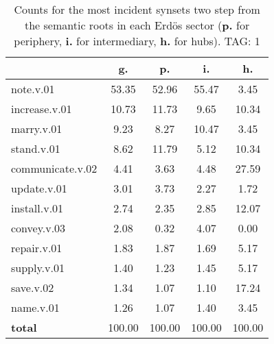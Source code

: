 \begin{table}[h!]
\begin{center}
\begin{tabular}{| l || c | c | c | c |}\hline
 & {\bf g.} & {\bf p.} & {\bf i.} & {\bf h.} \\\hline\hline
note.v.01 & 53.35  & 52.96  & 55.47  & 3.45 \\\hline
increase.v.01 & 10.73  & 11.73  & 9.65  & 10.34 \\\hline
marry.v.01 & 9.23  & 8.27  & 10.47  & 3.45 \\\hline
stand.v.01 & 8.62  & 11.79  & 5.12  & 10.34 \\\hline
communicate.v.02 & 4.41  & 3.63  & 4.48  & 27.59 \\\hline
update.v.01 & 3.01  & 3.73  & 2.27  & 1.72 \\\hline
install.v.01 & 2.74  & 2.35  & 2.85  & 12.07 \\\hline
convey.v.03 & 2.08  & 0.32  & 4.07  & 0.00 \\\hline
repair.v.01 & 1.83  & 1.87  & 1.69  & 5.17 \\\hline
supply.v.01 & 1.40  & 1.23  & 1.45  & 5.17 \\\hline
save.v.02 & 1.34  & 1.07  & 1.10  & 17.24 \\\hline
name.v.01 & 1.26  & 1.07  & 1.40  & 3.45 \\\hline\hline
{{\bf total}} & 100.00  & 100.00  & 100.00  & 100.00 \\\hline
\end{tabular}
\caption{Counts for the most incident synsets two step from the semantic roots in each Erd\"os sector ({\bf p.} for periphery, {\bf i.} for intermediary, {\bf h.} for hubs). TAG: 1}
\end{center}
\end{table}